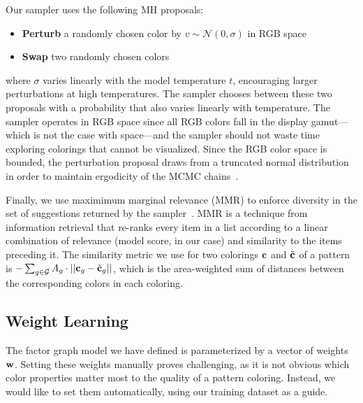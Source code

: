 Our sampler uses the following MH proposals:
\begin{itemize}
	\item{\textbf{Perturb} a randomly chosen color by $v \sim \mathcal{N}(0, \sigma)$ in RGB space}
	\item{\textbf{Swap} two randomly chosen colors}
\end{itemize}
where $\sigma$ varies linearly with the model temperature $t$, encouraging larger perturbations at high temperatures. The sampler chooses between these two proposals with a probability that also varies linearly with temperature. The sampler operates in RGB space since all RGB colors fall in the display gamut---which is not the case with \lab space---and the sampler should not waste time exploring colorings that cannot be visualized. Since the RGB color space is bounded, the perturbation proposal draws from a truncated normal distribution in order to maintain ergodicity of the MCMC chains~\cite{TruncatedGaussians}.

Finally, we use maximimum marginal relevance (MMR) to enforce diversity in the set of suggestions returned by the sampler~\cite{MMR}. MMR is a technique from information retrieval that re-ranks every item in a list according to a linear combination of relevance (model score, in our case) and similarity to the items preceding it. The similarity metric we use for two colorings $\mathbf{c}$ and $\tilde{\mathbf{c}}$ of a pattern is $- \sum_{g \in \mathcal{G}} {A_g \cdot ||\mathbf{c}_g - \tilde{\mathbf{c}}_g||}$, which is the area-weighted sum of \lab distances between the corresponding colors in each coloring.

\subsection{Weight Learning}
\label{sec:weights}

The factor graph model we have defined is parameterized by a vector of weights $\mathbf{w}$. Setting these weights manually proves challenging, as it is not obvious which color properties matter most to the quality of a pattern coloring. Instead, we would like to set them automatically, using our training dataset as a guide.

